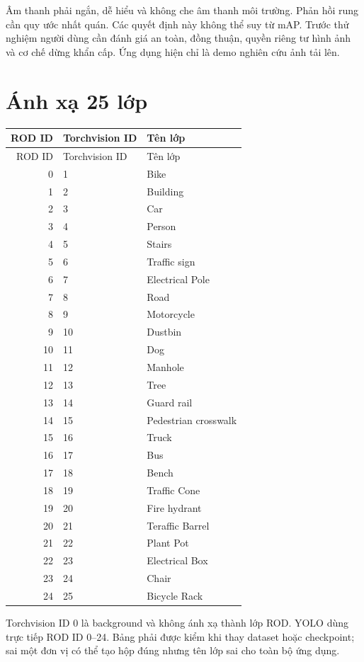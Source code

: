 Âm thanh phải ngắn, dễ hiểu và không che âm thanh môi trường. Phản hồi rung cần quy ước nhất quán. Các quyết định này không thể suy từ mAP. Trước thử nghiệm người dùng cần đánh giá an toàn, đồng thuận, quyền riêng tư hình ảnh và cơ chế dừng khẩn cấp. Ứng dụng hiện chỉ là demo nghiên cứu ảnh tải lên.

\section{Ánh xạ 25 lớp}
\begin{longtable}{rll}
\toprule ROD ID & Torchvision ID & Tên lớp\\\midrule\endfirsthead
\toprule ROD ID & Torchvision ID & Tên lớp\\\midrule\endhead
0&1&Bike\\1&2&Building\\2&3&Car\\3&4&Person\\4&5&Stairs\\
5&6&Traffic sign\\6&7&Electrical Pole\\7&8&Road\\8&9&Motorcycle\\9&10&Dustbin\\
10&11&Dog\\11&12&Manhole\\12&13&Tree\\13&14&Guard rail\\14&15&Pedestrian crosswalk\\
15&16&Truck\\16&17&Bus\\17&18&Bench\\18&19&Traffic Cone\\19&20&Fire hydrant\\
20&21&Teraffic Barrel\\21&22&Plant Pot\\22&23&Electrical Box\\23&24&Chair\\24&25&Bicycle Rack\\\bottomrule
\end{longtable}

Torchvision ID 0 là background và không ánh xạ thành lớp ROD. YOLO dùng trực tiếp ROD ID 0--24. Bảng phải được kiểm khi thay dataset hoặc checkpoint; sai một đơn vị có thể tạo hộp đúng nhưng tên lớp sai cho toàn bộ ứng dụng.
